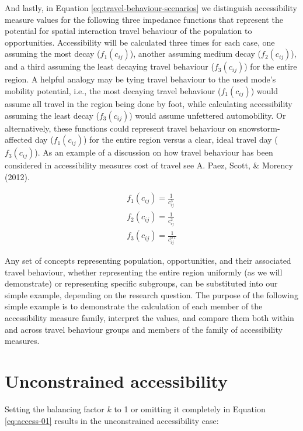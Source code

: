 \documentclass[
11pt, %
oneside, %
english, %
singlespacing, %
]{macthesis} %
\begin{document}
And lastly, in Equation \ref{eq:travel-behaviour-scenarios} we distinguish accessibility measure values for the following three impedance functions that represent the potential for spatial interaction travel behaviour of the population to opportunities. Accessibility will be calculated three times for each case, one assuming the most decay (\(f_1(c_{ij})\)), another assuming medium decay (\(f_2(c_{ij})\)), and a third assuming the least decaying travel behaviour (\(f_3(c_{ij})\)) for the entire region. A helpful analogy may be tying travel behaviour to the used mode's mobility potential, i.e., the most decaying travel behaviour (\(f_1(c_{ij})\)) would assume all travel in the region being done by foot, while calculating accessibility assuming the least decay (\(f_3(c_{ij})\)) would assume unfettered automobility. Or alternatively, these functions could represent travel behaviour on snowstorm-affected day (\(f_1(c_{ij})\)) for the entire region versus a clear, ideal travel day (\(f_3(c_{ij})\)). As an example of a discussion on how travel behaviour has been considered in accessibility measures cost of travel see A. Paez, Scott, \& Morency (2012).

\begin{equation}
\label{eq:travel-behaviour-scenarios}
\begin{array}{l}
f_1(c_{ij}) = \frac{1}{c_{ij}^3}\\
f_2(c_{ij}) = \frac{1}{c_{ij}^2}\\
f_3(c_{ij}) = \frac{1}{c_{ij}^{0.1}}
\end{array}
\end{equation} 

Any set of concepts representing population, opportunities, and their associated travel behaviour, whether representing the entire region uniformly (as we will demonstrate) or representing specific subgroups, can be substituted into our simple example, depending on the research question. The purpose of the following simple example is to demonstrate the calculation of each member of the accessibility measure family, interpret the values, and compare them both within and across travel behaviour groups and members of the family of accessibility measures.

\section{Unconstrained accessibility}\label{unconstrained-accessibility}

Setting the balancing factor \(k\) to 1 or omitting it completely in Equation \ref{eq:access-01} results in the unconstrained accessibility case:
\end{document}
